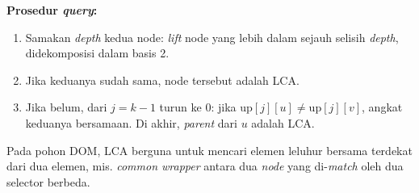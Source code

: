 \textbf{Prosedur \textit{query}:}
\begin{enumerate}
    \item Samakan \textit{depth} kedua node: \textit{lift} node yang lebih dalam sejauh selisih \textit{depth}, didekomposisi dalam basis 2.
    \item Jika keduanya sudah sama, node tersebut adalah LCA.
    \item Jika belum, dari $j = k-1$ turun ke $0$: jika $\mathrm{up}[j][u] \ne \mathrm{up}[j][v]$, angkat keduanya bersamaan. Di akhir, \textit{parent} dari $u$ adalah LCA.
\end{enumerate}

Pada pohon DOM, LCA berguna untuk mencari elemen leluhur bersama terdekat dari dua elemen, mis. \textit{common wrapper} antara dua \textit{node} yang di-\textit{match} oleh dua selector berbeda.
